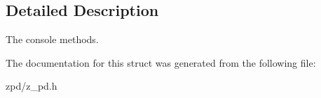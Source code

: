 \subsection{Detailed Description}
The console methods. 

The documentation for this struct was generated from the following file\-:\begin{DoxyCompactItemize}
\item 
zpd/z\-\_\-pd.\-h\end{DoxyCompactItemize}
